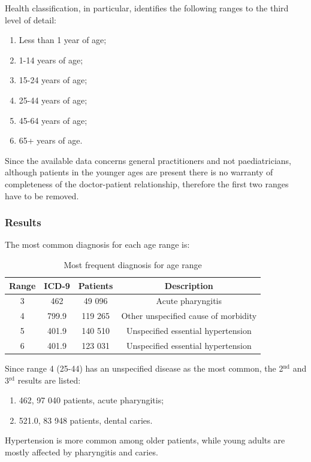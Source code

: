 Health classification, in particular, identifies the following ranges to the third level of detail:
\begin{enumerate}
	\item Less than 1 year of age;
	\item 1-14 years of age;
	\item 15-24 years of age;
	\item 25-44 years of age;
	\item 45-64 years of age;
	\item 65+ years of age.
\end{enumerate}

Since the available data concerns general practitioners and not paediatricians, although patients in the younger ages are present there is no warranty of completeness of the doctor-patient relationship, therefore the first two ranges have to be removed.

\subsubsection{Results}
The most common diagnosis for each age range is:
\begin{table}[h]
	\centering
	\begin{tabular}{c|c|c|c}
		\textbf{Range} & ICD-9 & \textbf{Patients} & \textbf{Description} \\
		\hline
		3 & 462 & 49 096 & Acute pharyngitis \\
		\hline
		4 & 799.9 & 119 265 & Other unspecified cause of morbidity \\
		\hline
		5 & 401.9 & 140 510 & Unspecified essential hypertension \\
		\hline
		6 & 401.9 & 123 031 & Unspecified essential hypertension \\
	\end{tabular}
	\caption{\small Most frequent diagnosis for age range}
\end{table}

Since range 4 (25-44) has an unspecified disease as the most common, the 2$^{\text{nd}}$ and 3$^{\text{rd}}$ results are listed:
\begin{enumerate}
	\item 462, 97 040 patients, acute pharyngitis;
	\item 521.0, 83 948 patients, dental caries.
\end{enumerate}
Hypertension is more common among older patients, while young adults are mostly affected by pharyngitis and caries.

